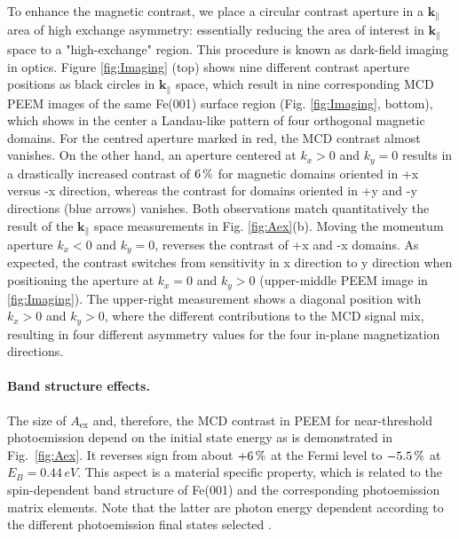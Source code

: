\documentclass[prl,twocolumn,floatfix]{revtex4-2}
\renewcommand{\vec}[1]{\boldsymbol{#1}}
\newcommand{\com}[1]{{\color{magenta} #1}}
\begin{document}
To enhance the magnetic contrast, we place a circular contrast aperture in a $\vec{k}_{\parallel}$ area of high exchange asymmetry: essentially reducing the area of interest in $\vec{k}_{\parallel}$ space to a "high-exchange" region. This procedure is known as dark-field imaging in optics. 
Figure \ref{fig:Imaging} (top) shows nine different contrast aperture positions as black circles in $\vec{k}_{\parallel}$ space, which result in nine corresponding MCD PEEM images of the same Fe(001) surface region (Fig. \ref{fig:Imaging}, bottom), which shows in the center a Landau-like pattern of four orthogonal magnetic domains. For the centred aperture marked in red, the MCD contrast almost vanishes. On the other hand, an aperture centered at $k_x > 0$ and $k_y=0$ results in a drastically increased contrast of $\unit[6]{\%}$ for magnetic domains oriented in +x versus -x direction, whereas the contrast for domains oriented in +y and -y directions (blue arrows) vanishes. Both observations match quantitatively the result of the $\vec{k}_{\parallel}$ space measurements in Fig. \ref{fig:Aex}(b). Moving the momentum aperture $k_x < 0$ and $k_y=0$, reverses the contrast of +x and -x domains. 
As expected, the contrast switches from sensitivity in x direction to y direction when positioning the aperture at $k_x = 0$ and $k_y > 0$ (upper-middle PEEM image in \ref{fig:Imaging}). The upper-right measurement shows a diagonal position with $k_x > 0$ and $k_y > 0$, where the different contributions to the MCD signal mix, resulting in four different asymmetry values for the four in-plane magnetization directions. 


\paragraph{Band structure effects.}

The size of $A_{\mathrm{ex}}$ and, therefore, the MCD contrast in PEEM for near-threshold photoemission depend on the initial state energy as is demonstrated in Fig.~\ref{fig:Aex}. It reverses sign from about $\unit[+6]{\%}$ at the Fermi level to $\unit[-5.5]{\%}$ at $E_B= 0.44\,eV$. \com{This aspect is a material specific property, which is related to the spin-dependent band structure of Fe(001) and the corresponding photoemission matrix elements. Note that the latter are photon energy dependent according to the different photoemission final states selected \todo{dis- cuss more ?}.}
\end{document}
